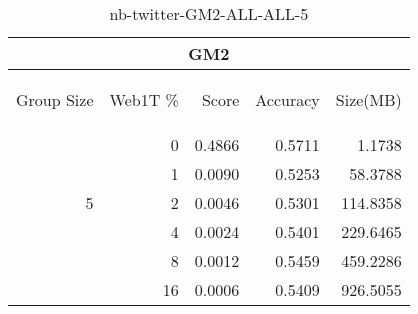 \begin{center}
\begin{table}[htbp]
\begin{tabular}{ | r | r | r | r | r |}
\hline
\multicolumn{5}{|c|}{GM2}\\
\hline
\begin{sideways}Group Size\end{sideways} & \begin{sideways}Web1T \%\end{sideways} & \begin{sideways}Score\end{sideways} & \begin{sideways}Accuracy\end{sideways} & \begin{sideways}Size(MB)\end{sideways}\\
\hline
\multirow{5}{*}{5}
 & 0 & 0.4866 & 0.5711 & 1.1738\\ \cline{2-5}
 & 1 & 0.0090 & 0.5253 & 58.3788\\ \cline{2-5}
 & 2 & 0.0046 & 0.5301 & 114.8358\\ \cline{2-5}
 & 4 & 0.0024 & 0.5401 & 229.6465\\ \cline{2-5}
 & 8 & 0.0012 & 0.5459 & 459.2286\\ \cline{2-5}
 & 16 & 0.0006 & 0.5409 & 926.5055\\ \cline{2-5}
\hline
\end{tabular}
\caption{nb-twitter-GM2-ALL-ALL-5}
\label{table:nb-twitter-GM2-ALL-ALL-5}
\end{table}
\end{center}

